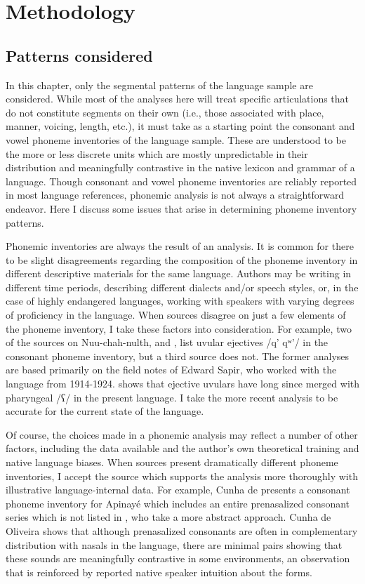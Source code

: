 \section{Methodology}\label{sec:4.2}
\subsection{Patterns considered}\label{sec:4.2.1}

  In this chapter, only the segmental patterns of the language sample are considered. While most of the analyses here will treat specific articulations that do not constitute segments on their own (i.e., those associated with place, manner, voicing, length, etc.), it must take as a starting point the consonant and vowel phoneme inventories of the language sample. These are understood to be the more or less discrete units which are mostly unpredictable in their distribution and meaningfully contrastive in the native lexicon and grammar of a language. Though consonant and vowel phoneme inventories are reliably reported in most language references, phonemic analysis is not always a straightforward endeavor. Here I discuss some issues that arise in determining phoneme inventory patterns.

  Phonemic inventories are always the result of an analysis. It is common for there to be slight disagreements regarding the composition of the phoneme inventory in different descriptive materials for the same language. Authors may be writing in different time periods, describing different dialects and/or speech styles, or, in the case of highly endangered languages, working with speakers with varying degrees of proficiency in the language. When sources disagree on just a few elements of the phoneme inventory, I take these factors into consideration. For example, two of the sources on Nuu-chah-nulth, \citet{Stonham1999} and \citet{Davidson2002}, list uvular ejectives /q’ qʷ’/ in the consonant phoneme inventory, but a third source \citep{Kim2003} does not. The former analyses are based primarily on the field notes of Edward Sapir, who worked with the language from 1914-1924. \citet{Kim2003} shows that ejective uvulars have long since merged with pharyngeal /ʕ/ in the present language. I take the more recent analysis to be accurate for the current state of the language. 

  Of course, the choices made in a phonemic analysis may reflect a number of other factors, including the data available and the author’s own theoretical training and native language biases. When sources present dramatically different phoneme inventories, I accept the source which supports the analysis more thoroughly with illustrative language-internal data. For example, Cunha de \citet{Oliveira2005} presents a consonant phoneme inventory for Apinayé which includes an entire prenasalized consonant series which is not listed in \citet{BurgessHam1968}, who take a more abstract approach. Cunha de Oliveira shows that although prenasalized consonants are often in complementary distribution with nasals in the language, there are minimal pairs showing that these sounds are meaningfully contrastive in some environments, an observation that is reinforced by reported native speaker intuition about the forms.


